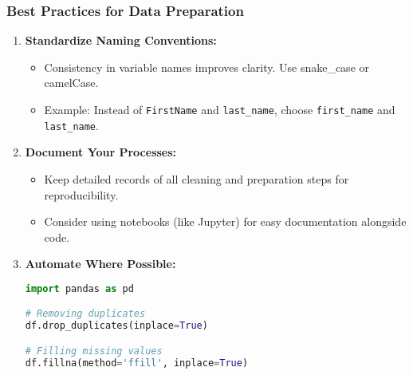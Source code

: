 \documentclass{beamer}
\begin{document}
\begin{frame}[fragile]
    \frametitle{Best Practices for Data Preparation}
    \begin{enumerate}
        \item \textbf{Standardize Naming Conventions:}
        \begin{itemize}
            \item Consistency in variable names improves clarity. Use snake\_case or camelCase.
            \item Example: Instead of \texttt{FirstName} and \texttt{last\_name}, choose \texttt{first\_name} and \texttt{last\_name}.
        \end{itemize}
        
        \item \textbf{Document Your Processes:}
        \begin{itemize}
            \item Keep detailed records of all cleaning and preparation steps for reproducibility.
            \item Consider using notebooks (like Jupyter) for easy documentation alongside code.
        \end{itemize}
        
        \item \textbf{Automate Where Possible:}
        \begin{lstlisting}[language=Python]
import pandas as pd

# Removing duplicates
df.drop_duplicates(inplace=True)

# Filling missing values
df.fillna(method='ffill', inplace=True)
        \end{lstlisting}
        
    \end{enumerate}
\end{frame}
\end{document}
